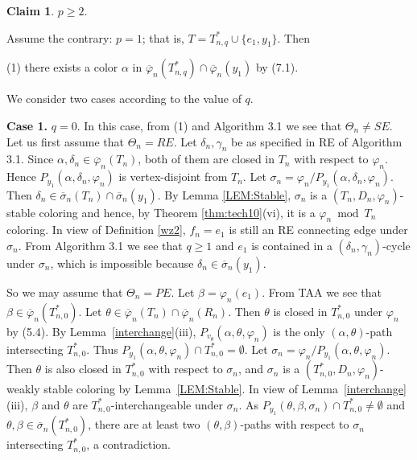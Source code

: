 \documentclass[11pt]{article}
\newtheorem{claim}{Claim}[section]
\newcommand{\phibar}{\overline{\varphi}}
\newcommand{\phiv}{\varphi}
\begin{document}
\begin{claim}\label{cla-p>0}
$p \ge  2.$
\end{claim}

\vspace{-1mm}
Assume the contrary: $p=1$; that is, $T=T_{n,q}^* \cup\{e_1,y_1\}$. Then 

(1) there exists a color $\alpha$ in $\overline{\varphi}_n(T_{n,q}^*)\cap\overline{\varphi}_n(y_1)$ by (7.1). 

\noindent We consider two cases according to the value of $q$. 

{\bf Case 1.} $q=0$. In this case, from (1) and Algorithm 3.1 we see that $\Theta_n\ne SE$. Let us first assume
that $\Theta_n=RE$. Let $\delta_n, \gamma_n$ be as specified in RE of Algorithm 3.1.
Since $\alpha, \delta_n \in \overline{\varphi}_n(T_n)$, both of them are closed in $T_n$ with
respect to $\varphi_n$. Hence $P_{y_1}(\alpha, \delta_n, \varphi_n)$ is vertex-disjoint from $T_n$.  Let
$\sigma_n=\varphi_n/P_{y_1}(\alpha, \delta_n, \varphi_n)$. Then $\delta_n \in \overline{\sigma}_n(T_n) \cap 
\overline{\sigma}_n(y_1)$. By Lemma \ref{LEM:Stable}, $\sigma_n$ is a $(T_n, D_n, \varphi_n)$-stable coloring
and hence, by Theorem \ref{thm:tech10}(vi), it is a $\phiv_n\bmod T_n$ coloring. In view of Definition \ref{wz2}, 
$f_n=e_1$ is still an RE connecting edge under $\sigma_n$. From Algorithm 3.1 we see that
$q\geq 1$ and $e_1$ is contained in a $(\delta_n,\gamma_n)$-cycle under $\sigma_n$, which is 
impossible because $\delta_n \in \overline{\sigma}_n(y_1)$. 

So we may assume that $\Theta_n=PE$. Let $\beta=\varphi_n(e_1)$. From TAA we see that $\beta\in\phibar_n(T_{n,0}^*)$. 
Let $\theta\in \phibar_n(T_n) \cap \phibar_n(R_n)$. Then $\theta$ is closed in $T_{n,0}^*$ under $\varphi_n$ by (5.4).
By Lemma~\ref{interchange}(iii), $P_{v_{\theta}}(\alpha,\theta,\varphi_n)$ 
is the only $(\alpha,\theta)$-path intersecting $T_{n,0}^*$. Thus $P_{y_1}(\alpha,\theta,\varphi_n)\cap T_{n,0}^*=
\emptyset$. Let $\sigma_n=\varphi_n/P_{y_1}(\alpha,\theta,\varphi_n)$. Then
$\theta$ is also closed in $T_{n,0}^*$ with respect to $\sigma_n$, and $\sigma_n$ is a $(T_{n,0}^*, D_n, \varphi_n)$-weakly stable coloring by Lemma~\ref{LEM:Stable}. In view of
Lemma~\ref{interchange}(iii), $\beta$ and $\theta$ are $T_{n,0}^*$-interchangeable under $\sigma_n$.  
As $P_{y_1}(\theta,\beta,\sigma_n)\cap T_{n,0}^*\neq\emptyset$ and $\theta,\beta\in\overline{\sigma}_n(T_{n,0}^*)$, there are at least two $(\theta,\beta)$-paths with
respect to $\sigma_n$ intersecting $T_{n,0}^*$, a contradiction.   
\end{document}
